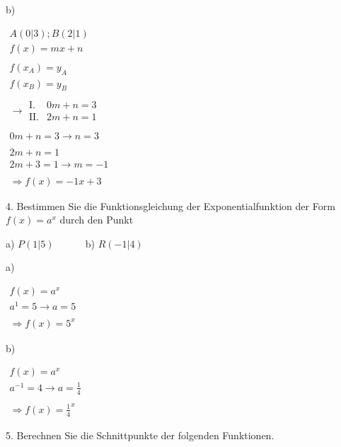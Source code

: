 \documentclass[varwidth]{article}
\begin{document}
b)

$
\begin{array}{l}
A(0|3); B(2|1) \\
f(x) = mx+n \\~\\
f(x_A) = y_A \\
f(x_B) = y_B \\~\\
\rightarrow
\begin{array}{rl}
    \text{I.} & 0m + n = 3 \\
    \text{II.} & 2m + n = 1
\end{array}
\\~\\
0m + n = 3 \rightarrow n = 3
\\~\\
2m + n = 1 \\
2m + 3 = 1 \rightarrow m = -1
\\~\\
\Rightarrow \boxed{f(x) = -1x + 3}
\end{array}
$

\vspace*{5mm}

{\large 4. Bestimmen Sie die Funktionsgleichung der Exponentialfunktion der Form $f(x)=a^x$ durch den Punkt}

a) $P(1|5)$ ~~~~~ b) $R(-1|4)$

\vspace*{5mm}

a)

$
\begin{array}{l}
f(x) = a^x \\
a^1 = 5 \rightarrow a = 5 \\~\\
\Rightarrow \boxed{f(x) = 5^x}
\end{array}
$

\vspace*{5mm}

b)

$
\begin{array}{l}
f(x) = a^x \\
a^{-1} = 4 \rightarrow a = \frac14 \\~\\
\Rightarrow \boxed{f(x) = \frac14^x}
\end{array}
$

\vspace*{5mm}

\pagebreak
{\large 5. Berechnen Sie die Schnittpunkte der folgenden Funktionen.}
\end{document}
